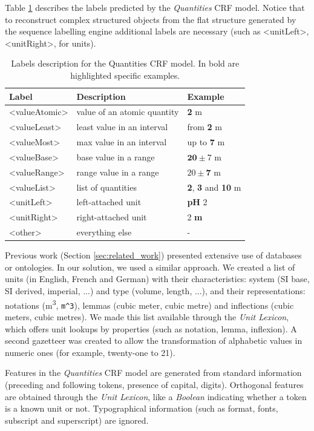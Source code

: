 \documentclass[sigconf]{acmart}
\begin{document}
Table \ref{tab:quantities-model-labels} describes the labels predicted by the \textit{Quantities} CRF model. Notice that to reconstruct complex structured objects from the flat structure generated by the sequence labelling engine additional labels are necessary (such as <unitLeft>, <unitRight>, for units).

\begin{table}[ht]
  \caption{Labels description for the Quantities CRF model. In bold are highlighted specific examples.}
  \label{tab:quantities-model-labels}
  \begin{tabular}{lll}
    \toprule
    Label & Description & Example\\
    \midrule
    <valueAtomic> & value of an atomic quantity & \textbf{2} m \\
    <valueLeast> & least value in an interval & from \textbf{2} m \\
    <valueMost> & max value in an interval & up to \textbf{7} m \\
    <valueBase> & base value in a range & $\textbf{20}\pm7$ m \\
    <valueRange> & range value in a range & $20 \pm \textbf{7}$ m \\
    <valueList> & list of quantities & \textbf{2}, \textbf{3} and \textbf{10} m \\
    <unitLeft> & left-attached unit & \textbf{pH} 2 \\
    <unitRight> & right-attached unit & 2 \textbf{m} \\
    <other> & everything else & - \\
  \bottomrule
\end{tabular}
\end{table}

Previous work (Section \ref{sec:related_work}) presented extensive use of databases or ontologies. In our solution, we used a similar approach. We created a list of units (in English, French and German) with their characteristics: system (SI base, SI derived, imperial, ...) and type (volume, length, ...), and their representations: notations (m\textsuperscript{3}, \texttt{m\^{}3}), lemmas (cubic meter, cubic metre) and inflections (cubic meters, cubic metres). We made this list available through the \textit{Unit Lexicon}, which offers unit lookups by properties (such as notation, lemma, inflexion). A second gazetteer was created to allow the transformation of alphabetic values in numeric ones (for example, twenty-one to 21).

Features in the \textit{Quantities} CRF model are generated from standard information (preceding and following tokens, presence of capital, digits). Orthogonal features are obtained through the \textit{Unit Lexicon}, like a \textit{Boolean} indicating whether a token is a known unit or not. Typographical information (such as format, fonts, subscript and superscript) are ignored. 
\end{document}
